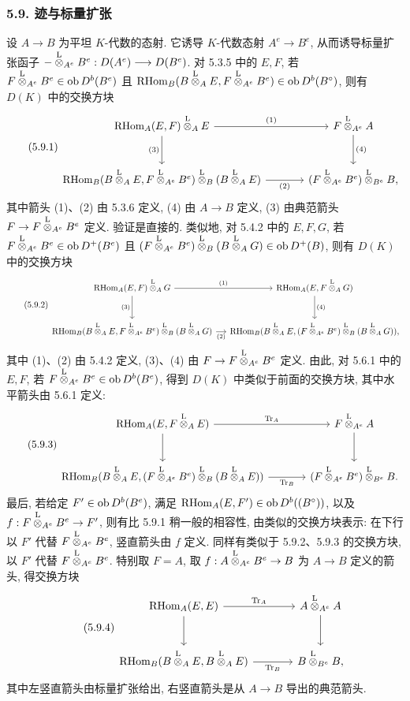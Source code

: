 \subsubsection*{5.9. 迹与标量扩张}

设 $A\to B$ 为平坦 $K$-代数的态射. 它诱导 $K$-代数态射 $A^e\to B^e$, 从而诱导标量扩张函子 $-\overset{\mathrm L}{\otimes}_{A^e}B^e:D(A^e)\longrightarrow D(B^e)$.
对 5.3.5 中的 $E,F$, 若 $F\overset{\mathrm L}{\otimes}_{A^e}B^e\in\operatorname{ob} D^b(B^e)$ 且 $\mathrm{RHom}_B(B\overset{\mathrm L}{\otimes}_AE,F\overset{\mathrm L}{\otimes}_{A^e}B^e)\in\operatorname{ob} D^b(B^\circ)$, 则有 $D(K)$ 中的交换方块
\begin{equation}\tag{5.9.1}
\begin{tikzcd}[column sep=large,row sep=large]
\RHom_A(E,F)\lten_AE \arrow[r,"(1)"] \arrow[d,"(3)"'] & F\lten_{A^e}A \arrow[d,"(4)"]\\
\RHom_B(B\lten_AE,F\lten_{A^e}B^e)\lten_B(B\lten_AE) \arrow[r,"(2)"'] & (F\lten_{A^e}B^e)\lten_{B^e}B,
\end{tikzcd}
\end{equation}
其中箭头 (1)、(2) 由 5.3.6 定义, (4) 由 $A\to B$ 定义, (3) 由典范箭头 $F\to F\overset{\mathrm L}{\otimes}_{A^e}B^e$ 定义. 验证是直接的. 类似地, 对 5.4.2 中的 $E,F,G$, 若 $F\overset{\mathrm L}{\otimes}_{A^e}B^e\in\operatorname{ob} D^+(B^e)$ 且 $(F\overset{\mathrm L}{\otimes}_{A^e}B^e)\overset{\mathrm L}{\otimes}_B(B\overset{\mathrm L}{\otimes}_AG)\in\operatorname{ob} D^+(B)$, 则有 $D(K)$ 中的交换方块
\begin{equation}\tag{5.9.2}
\begin{tikzcd}[column sep=small,row sep=large]
\RHom_A(E,F)\lten_AG \arrow[r,"(1)"] \arrow[d,"(3)"'] & \RHom_A(E,F\lten_AG) \arrow[d,"(4)"]\\
\RHom_B(B\lten_AE,F\lten_{A^e}B^e)\lten_B(B\lten_AG) \arrow[r,"(2)"'] & \RHom_B(B\lten_AE,(F\lten_{A^e}B^e)\lten_B(B\lten_AG)),
\end{tikzcd}
\end{equation}
其中 (1)、(2) 由 5.4.2 定义, (3)、(4) 由 $F\to F\overset{\mathrm L}{\otimes}_{A^e}B^e$ 定义. 由此, 对 5.6.1 中的 $E,F$, 若 $F\overset{\mathrm L}{\otimes}_{A^e}B^e\in\operatorname{ob} D^b(B^e)$, 得到 $D(K)$ 中类似于前面的交换方块, 其中水平箭头由 5.6.1 定义:
\begin{equation}\tag{5.9.3}
\begin{tikzcd}[column sep=large,row sep=large]
\RHom_A(E,F\lten_AE) \arrow[r,"\Tr_A"] \arrow[d] & F\lten_{A^e}A \arrow[d]\\
\RHom_B(B\lten_AE,(F\lten_{A^e}B^e)\lten_B(B\lten_AE)) \arrow[r,"\Tr_B"'] & (F\lten_{A^e}B^e)\lten_{B^e}B.
\end{tikzcd}
\end{equation}
最后, 若给定 $F'\in\operatorname{ob} D^b(B^e)$, 满足 $\mathrm{RHom}_A(E,F')\in\operatorname{ob} D^b((B^\circ))$, 以及 $f:F\overset{\mathrm L}{\otimes}_{A^e}B^e\to F'$, 则有比 5.9.1 稍一般的相容性, 由类似的交换方块表示: 在下行以 $F'$ 代替 $F\overset{\mathrm L}{\otimes}_{A^e}B^e$, 竖直箭头由 $f$ 定义. 同样有类似于 5.9.2、5.9.3 的交换方块, 以 $F'$ 代替 $F\overset{\mathrm L}{\otimes}_{A^e}B^e$. 特别取 $F=A$, 取 $f:A\overset{\mathrm L}{\otimes}_{A^e}B^e\to B$ 为 $A\to B$ 定义的箭头, 得交换方块
\begin{equation}\tag{5.9.4}
\begin{tikzcd}[column sep=large,row sep=large]
\RHom_A(E,E) \arrow[r,"\Tr_A"] \arrow[d] & A\lten_{A^e}A \arrow[d]\\
\RHom_B(B\lten_AE,B\lten_AE) \arrow[r,"\Tr_B"'] & B\lten_{B^e}B,
\end{tikzcd}
\end{equation}
其中左竖直箭头由标量扩张给出, 右竖直箭头是从 $A\to B$ 导出的典范箭头.


